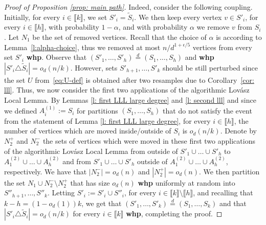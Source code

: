 \documentclass[notitlepage]{scrartcl}
\newcommand{\br}[1]{\llbracket{#1}\rrbracket}
\begin{document}
\begin{proof}[Proof of Proposition \ref{prop: main path}]
Indeed, consider the following coupling. Initially, for every $i\in \br{k}$, we set $S'_i=\tilde{S}_i$. We then keep every vertex $v\in S'_i$, for every $i\in \br{h}$, with probability $1-\alpha$, and with probability $\alpha$ we remove $v$ from $S_i$. Let $N_1$ be the set of removed vertices. Recall that the choice of $\alpha$ is according to Lemma~\ref{l:alpha-choice}, thus we removed at most $n/d^{1+\epsilon/5}$ vertices from every set $S'_i$ \textbf{whp}. %
 Observe that $(S'_1,\ldots,S'_h)\stackrel{d}=(S_1,\ldots,S_h)$ and \textbf{whp} $|S'_i\triangle \tilde{S}_i|=o_d(n/k)$. However, sets $S'_{h+1},\ldots,S'_k$ should be still perturbed since the set $U$ from~\eqref{eq:U-def} is obtained after two resamples due to Corollary~\ref{cor: lll}. Thus, we now consider the first two applications of the algorithmic Lov\'asz Local Lemma. By Lemmas \ref{l: first LLL large degree} and \ref{l: second lll} and since we defined $A_i^{(1)}:=S_i$ for partitions $(S_1,\ldots,S_h)$ that do not satisfy the event from the statement of Lemma \ref{l: first LLL large degree}, for every $i \in \br{h}$, the number of vertices which are moved inside/outside of $S_i$ is $o_d(n/k)$. Denote by $N^{+}_2$ and $N_2^-$ the sets of vertices which were moved in these first two applications of the algorithmic Lov\'asz Local Lemma from outside of $S'_1\cup\ldots\cup S'_h$ to $A_1^{(2)}\cup\ldots\cup A_h^{(2)}$ and from $S'_1\cup\ldots\cup S'_h$ outside of $A_1^{(2)}\cup\ldots\cup A_h^{(2)}$, respectively. We have that $|N_2^-|=o_d(n)$ and $|N_2^+|=o_d(n)$. We then partition the set $N_1\cup N_2^-\setminus N_2^+$ that has size $o_d(n)$ \textbf{whp} uniformly at random into $S''_{h+1},\ldots,S''_k$. Letting $S'_i:=S'_i\cup S''_i$, for every $i\in\br{k}\setminus\br{h}$, and recalling that $k-h=(1-o_d(1))k$, we get that $(S'_1,\ldots,S'_k)\stackrel{d}=(S_1,\ldots,S_k)$ and that $|S'_i\triangle \tilde{S}_i|=o_d(n/k)$ for every $i\in \br{k}$ \textbf{whp}, completing the proof.
\end{proof}
\end{document}

